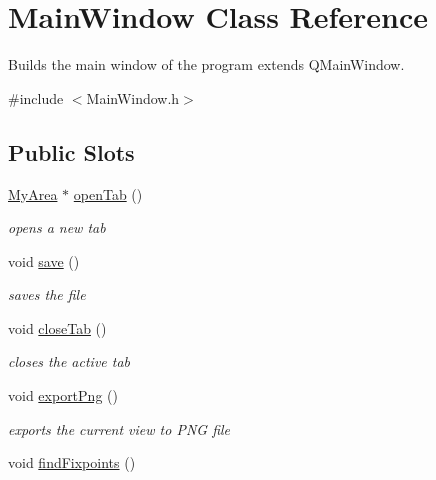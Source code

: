 \hypertarget{class_main_window}{\section{\-Main\-Window \-Class \-Reference}
\label{class_main_window}
}


\-Builds the main window of the program extends \-Q\-Main\-Window.  




{\ttfamily \#include $<$\-Main\-Window.\-h$>$}

\subsection*{\-Public \-Slots}
\begin{DoxyCompactItemize}
\item 
\hyperlink{class_my_area}{\-My\-Area} $\ast$ \hyperlink{class_main_window_a3ecd23a0dc61406e34522af9aae150bb}{open\-Tab} ()
\begin{DoxyCompactList}\small\item\em opens a new tab \end{DoxyCompactList}\item 
\hypertarget{class_main_window_a3ba1a371fb10e731ae0926ae85efeb4f}{void \hyperlink{class_main_window_a3ba1a371fb10e731ae0926ae85efeb4f}{save} ()}\label{class_main_window_a3ba1a371fb10e731ae0926ae85efeb4f}

\begin{DoxyCompactList}\small\item\em saves the file \end{DoxyCompactList}\item 
\hypertarget{class_main_window_af622a541e4d87f86e9e83d29af60fe19}{void \hyperlink{class_main_window_af622a541e4d87f86e9e83d29af60fe19}{close\-Tab} ()}\label{class_main_window_af622a541e4d87f86e9e83d29af60fe19}

\begin{DoxyCompactList}\small\item\em closes the active tab \end{DoxyCompactList}\item 
\hypertarget{class_main_window_a111875a1d82e77178636322ab485e4bb}{void \hyperlink{class_main_window_a111875a1d82e77178636322ab485e4bb}{export\-Png} ()}\label{class_main_window_a111875a1d82e77178636322ab485e4bb}

\begin{DoxyCompactList}\small\item\em exports the current view to \-P\-N\-G file \end{DoxyCompactList}\item 
\hypertarget{class_main_window_a879f655b0a921bc80bd316579e98c366}{void \hyperlink{class_main_window_a879f655b0a921bc80bd316579e98c366}{find\-Fixpoints} ()}\label{class_main_window_a879f655b0a921bc80bd316579e98c366}


\end{DoxyCompactItemize}
